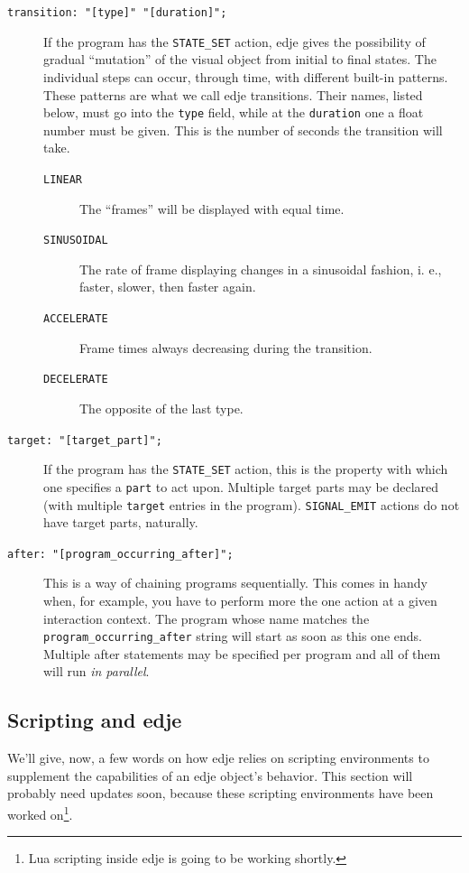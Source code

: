 \documentclass[a4paper]{profusion}
\begin{document}
\begin{description}
\item[\texttt{transition: "[type]" "[duration]";}] If the program has
  the \texttt{STATE\_SET} action, edje gives the possibility of
  gradual ``mutation'' of the visual object from initial to final
  states. The individual steps can occur, through time, with different
  built-in patterns. These patterns are what we call edje
  transitions. Their names, listed below, must go into the
  \texttt{type} field, while at the \texttt{duration} one a float
  number must be given. This is the number of seconds the transition
  will take.

  \begin{description}
  \item[\texttt{LINEAR}] The ``frames'' will be displayed with equal
    time.
  \item[\texttt{SINUSOIDAL}] The rate of frame displaying changes in a
    sinusoidal fashion, i. e., faster, slower, then faster again.
  \item[\texttt{ACCELERATE}] Frame times always decreasing during the
    transition.
  \item[\texttt{DECELERATE}] The opposite of the last type.
\end{description}

\item[\texttt{target: "[target\_part]";}] If the program has the
  \texttt{STATE\_SET} action, this is the property with which one
  specifies a \texttt{part} to act upon. Multiple target parts may be
  declared (with multiple \texttt{target} entries in the program).
  \texttt{SIGNAL\_EMIT} actions do not have target parts, naturally.

\item[\texttt{after: "[program\_occurring\_after]";}] This is a way of
  chaining programs sequentially. This comes in handy when, for
  example, you have to perform more the one action at a given
  interaction context. The program whose name matches the
  \texttt{program\_occurring\_after} string will start as soon as this
  one ends. Multiple after statements may be specified per program and
  all of them will run \emph{in parallel}.
\end{description}

\subsection{Scripting and edje}
\label{sec:scripts}

We'll give, now, a few words on how edje relies on scripting
environments to supplement the capabilities of an edje object's
behavior. This section will probably need updates soon, because these
scripting environments have been worked on\footnote{Lua scripting
  inside edje is going to be working shortly.}.
\end{document}
